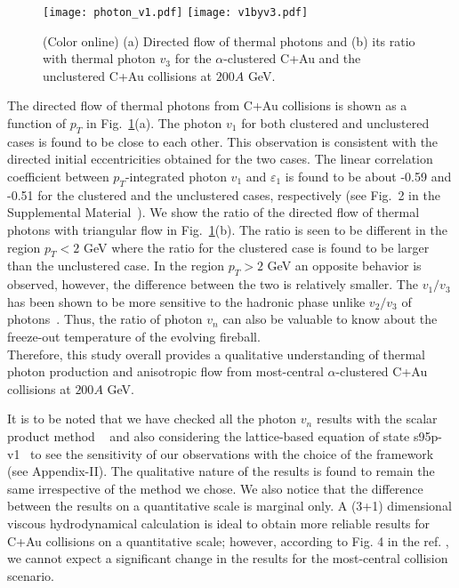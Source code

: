 \documentclass[aps,prc,twocolumn,floatfix,12pts,superscriptaddress]{revtex4}
\begin{document}
{\begin{figure}[htbp!]
	\centering
	{\texttt{[image: photon\_v1.pdf]}}
	{\texttt{[image: v1byv3.pdf]}}
	\vspace{-3mm}
	\caption {(Color online)  (a) Directed flow of thermal photons and (b) its ratio with thermal photon $ v_3$  for the $\alpha$-clustered C+Au and the unclustered C+Au collisions at $200A$ GeV.}
	\label{fig6}
\end{figure}  
The directed flow of thermal photons from C+Au collisions is shown as a function of $ p_T$  in Fig.~\ref{fig6}(a). The photon $v_1$ for both clustered and unclustered cases is found to be close to each other. This observation is consistent with the directed initial eccentricities obtained for the two cases. The linear correlation coefficient between $p_T$-integrated photon $v_1$ and $\varepsilon_1$ is found to be about -0.59 and -0.51 for the clustered and the unclustered cases, respectively  {(see Fig.~2 in the Supplemental Material~\cite{supplemental})}. We show the ratio of the directed flow of thermal photons with triangular flow in Fig.~\ref{fig6}(b). The ratio is seen to be different in the region $ p_T < 2$ GeV where the ratio for the clustered case is found to be larger than the unclustered case. In the region $ p_T >2$ GeV an opposite behavior is observed, however, the difference between the two is relatively smaller. The $v_1/v_3$ has been shown to be more sensitive to the hadronic phase unlike  $v_2/v_3$ of photons~\cite{Chatterjee:2021bhz}. Thus, the ratio of photon $v_n$ can also be valuable to know about the freeze-out temperature of the evolving fireball. \\

Therefore, this study overall provides a qualitative understanding of thermal photon production and anisotropic flow from most-central $\alpha$-clustered C+Au collisions at $200A$ GeV. { It is to be noted that we have checked all the photon $v_n$ results with the scalar product method  ~\cite{David:2019wpt,Shen:2013cca} and also considering the lattice-based equation of state s95p-v1~\cite{Huovinen:2009yb} to see the sensitivity of our observations with the choice of the framework (see Appendix-II). The qualitative nature of the results is found to remain the same irrespective of the method we chose. We also notice that the difference between the results on a quantitative scale is marginal only. { A (3+1) dimensional viscous hydrodynamical calculation is ideal to obtain more reliable results for C+Au collisions on a quantitative scale; however, according to Fig. 4 in the ref. \cite{Shen:2016zpp}, we cannot expect a significant change in the results for the most-central collision scenario.}


}}
\end{document}
